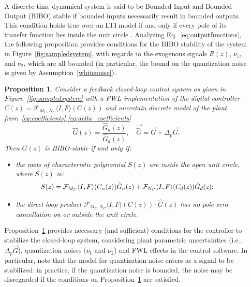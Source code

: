 \documentclass[final]{sig-alternate-05-2015}
\newcommand{\red}[1]{{\color{red}#1}}
\newtheorem{myprop}{Proposition}
\begin{document}

A discrete-time dynamical system is said to be Bounded-Input and Bounded-Output
(BIBO) stable if bounded inputs necessarily result in bounded outputs. 
This condition holds true over an LTI model if and only if every pole of its transfer function lies inside the unit circle \cite{Astrom08}.  
Analyzing Eq.~\eqref{eq:outputfunctions}, 
the following proposition provides conditions for the BIBO stability of the system in Figure~\ref{fig:sampledsystem}, 
with regards to the exogenous signals $R(z)$, $\nu_{1}$, and $\nu_{2}$, which are all bounded 
(in particular, the bound on the quantization noise is given by
Assumption~\ref{whitenoise}). 
%
\begin{myprop}{\cite{Bessa16,fadali}}
\label{prop:eq_int_stab} 
%
Consider a feedback closed-loop control system as given in
Figure~\ref{fig:sampledsystem} with a FWL implementation of the digital
controller $\hat{C}(z) =\mathcal{F}_{M_C,N_C}\langle I,F \rangle(C(z))$ and uncertain discrete
model of the plant from~\eqref{eq:coefficients},\eqref{eq:delta_coefficients} 
%
$$
\hat{G}(z) =\frac{\hat{G}_n(z)}{\hat{G}_d(z)}, \quad \vec{\hat{G}}=\vec{G}+\Delta_p \vec{G}.
$$
%
Then $\hat{G}(z)$ is BIBO-stable if and only if:
%
\begin{itemize}
\item  the roots of characteristic polynomial $S(z)$ are inside the open unit circle, where $S(z)$ is:
\begin{equation}
\label{eq:internal_stab_lemma}
\hspace{-3ex} S(z)=\mathcal{F}_{M_C}\langle I,F \rangle(C_n(z))\hat{G}_n(z)+\mathcal{F}_{N_C}\langle I,F \rangle(C_d(z))\hat{G}_d(z);
\end{equation}
\item the direct loop product $\mathcal{F}_{M_C,N_C}\langle I,F \rangle(C(z))\cdot \hat{G}(z)$ has no pole-zero cancellation on or outside the unit circle.
\end{itemize}
\end{myprop}

Proposition~\ref{prop:eq_int_stab} provides necessary (and sufficient) conditions for the
controller to stabilize the closed-loop system, considering plant
parametric uncertainties (i.e., $\Delta_p \vec{G}$), quantization noises
($\nu_{1}$ and $\nu_{2}$) and FWL effects in the control software.  
In particular, 
note that the model for quantization noise enters as a signal to be stabilized: 
in practice, 
if the quantization noise is bounded, 
the noise may be disregarded if the conditions on
Proposition~\ref{prop:eq_int_stab} are satisfied.  
\end{document}
